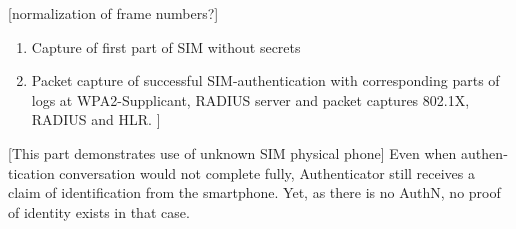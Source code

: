 \documentclass[12pt,a4paper,english]{tutthesis}
\begin{document}
\begin{otherlanguage}{english}
[normalization of frame numbers?]

\begin{enumerate}
\item Capture of first part of SIM without secrets
\item Packet capture of successful SIM-authentication with corresponding parts of logs at WPA2-Supplicant, RADIUS server and packet captures 802.1X, RADIUS and HLR. ]
\end{enumerate}

[This part demonstrates use of unknown SIM physical phone]  
Even when authentication conversation would not complete fully,
Authenticator still receives a claim of identification from the
smartphone. Yet, as there is no AuthN, no proof of identity exists in
that case.




\end{otherlanguage}
\end{document}
